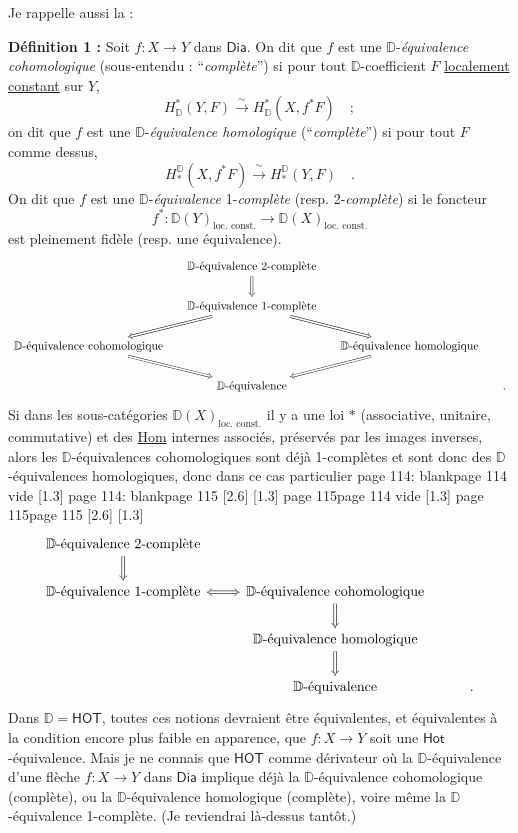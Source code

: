 \documentclass[11pt,leqno]{article}
\newcommand{\printedpage}[1]{\marginnote{\scriptsize\sffamily ed.\ #1}}
\newcommand{\msp}[1]{%
  \begingroup\def\thismsp{#1}\def\blankmsp{page 114 vide}%
  \ifx\thismsp\blankmsp
    \marginnote{\scriptsize\sffamily [114: vide]}[1.3\baselineskip]%
  \else\def\followingmsp{page 115}%
    \ifx\thismsp\followingmsp
      \marginnote{\scriptsize\sffamily [page 115]}[2.6\baselineskip]%
    \else\marginnote{\scriptsize\sffamily [#1]}[1.3\baselineskip]\fi
  \fi\endgroup}
\newcommand{\DD}{\ensuremath{\mathbb{D}}}
\newcommand{\Dia}{\ensuremath{\mathsf{Dia}}}
\newcommand{\Hot}{\ensuremath{\mathsf{Hot}}}
\newcommand{\HOT}{\ensuremath{\mathsf{HOT}}}
\begin{document}
Je rappelle aussi la :

\textbf{Définition 1 :} Soit $f : X \to Y$ dans \Dia. On dit que $f$ est une $\DD$-\textit{équivalence cohomologique} (sous-entendu : “\textit{complète}”) si pour tout $\DD$-coefficient $F$ \underline{localement} \underline{constant} sur $Y$,
\[ H^{*}_{\DD}(Y,F) \xrightarrow{\ \sim\ } H^{*}_{\DD}(X,f^{*}F) \quad ; \]
on dit que $f$ est une $\DD$-\textit{équivalence homologique} (“\textit{complète}”) si pour tout $F$ comme dessus,
\[ H_{*}^{\DD}(X,f^{*}F) \xrightarrow{\ \sim\ } H_{*}^{\DD}(Y,F) \quad . \]
On dit que $f$ est une $\DD$-\textit{équivalence} 1-\textit{complète} (resp. 2-\textit{complète}) si le foncteur
\[ f^{*} : \DD(Y)_{\text{loc. const.}} \longrightarrow \DD(X)_{\text{loc. const.}} \]
est pleinement fidèle (resp. une équivalence).
\begingroup\small
\[
\begin{tikzcd}[column sep=small]
 & \text{$\DD$-équivalence 2-complète} \arrow[d, Rightarrow] & & \\
 & \text{$\DD$-équivalence 1-complète} \arrow[dl, Rightarrow] \arrow[dr, Rightarrow] & & \\
\text{$\DD$-équivalence cohomologique} \arrow[dr, Rightarrow] & & \text{$\DD$-équivalence homologique} \arrow[dl, Rightarrow] & \\
 & \text{$\DD$-équivalence} & & .
\end{tikzcd}
\]
\endgroup
Si dans les sous-catégories $\DD(X)_{\text{loc. const.}}$ il y a une loi $*$ (associative, unitaire, commutative) et des \underline{\textsf{Hom}} internes associés, préservés par les images inverses, alors les $\DD$-équivalences cohomologiques sont déjà 1-complètes et sont donc des $\DD$-équivalences homologiques, donc dans ce cas particulier
\printedpage{68}
\msp{page 114: blank}
\msp{page 115}
\[
\begin{tikzcd}
\text{$\DD$-équivalence 2-complète} \arrow[d, Rightarrow] & & \\
\text{$\DD$-équivalence 1-complète} \arrow[r, Leftrightarrow] & \text{$\DD$-équivalence cohomologique} \arrow[d, Rightarrow] & \\
 & \text{$\DD$-équivalence homologique} \arrow[d, Rightarrow] & \\
 & \text{$\DD$-équivalence} & .
\end{tikzcd}
\]
Dans $\DD = \mathsf{HOT}$, toutes ces notions devraient être équivalentes, et équivalentes à la condition encore plus faible en apparence, que $f : X \to Y$ soit une \Hot-équivalence. Mais je ne connais que \HOT{} comme dérivateur où la $\DD$-équivalence d'une flèche $f : X \to Y$ dans \Dia{} implique déjà la $\DD$-équivalence cohomologique (complète), ou la $\DD$-équivalence homologique (complète), voire même la $\DD$-équivalence 1-complète. (Je reviendrai là-dessus tantôt.)
\end{document}
